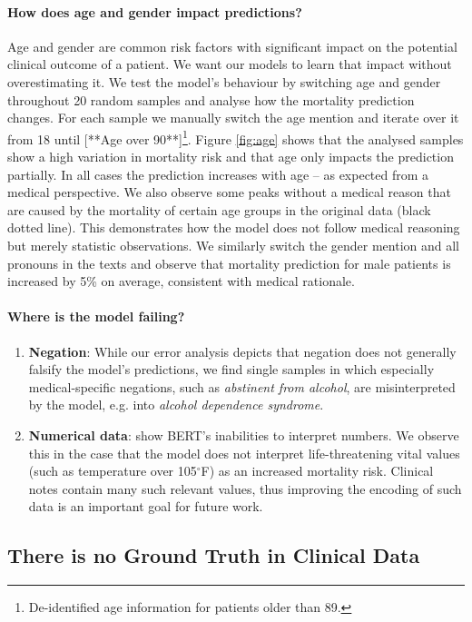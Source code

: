 \documentclass[11pt,a4paper]{article}
\begin{document}
\paragraph{How does age and gender impact predictions?} Age and gender are common risk factors with significant impact on the potential clinical outcome of a patient. We want our models to learn that impact without overestimating it. We test the model's behaviour by switching age and gender throughout 20 random samples and analyse how the mortality prediction changes. For each sample we manually switch the age mention and iterate over it from 18 until [**Age over 90**]\footnote{De-identified age information for patients older than 89.}. Figure \ref{fig:age} shows that the analysed samples show a high variation in mortality risk and that age only impacts the prediction partially. In all cases the prediction increases with age -- as expected from a medical perspective. We also observe some peaks without a medical reason that are caused by the mortality of certain age groups in the original data (black dotted line). This demonstrates how the model does not follow medical reasoning but merely statistic observations. We similarly switch the gender mention and all pronouns in the texts and observe that mortality prediction for male patients is increased by 5\% on average, consistent with medical rationale.

\paragraph{Where is the model failing?}  
\begin{enumerate}
    \item \textbf{Negation}: While our error analysis depicts that negation does not generally falsify the model's predictions, we find single samples in which especially medical-specific negations, such as \textit{\hbox{abstinent} from alcohol}, are misinterpreted by the model, e.g. into \textit{alcohol \hbox{dependence} syndrome}.
    \item \textbf{Numerical data}: \citet{bert-numbers} show BERT's inabilities to interpret numbers. We observe this in the case that the model does not interpret life-threatening vital values (such as temperature over 105$^{\circ}$F) as an increased mortality risk. Clinical notes contain many such relevant values, thus improving the encoding of such data is an important goal for future work.
\end{enumerate}

\subsection{There is no Ground Truth in Clinical Data}
\end{document}
